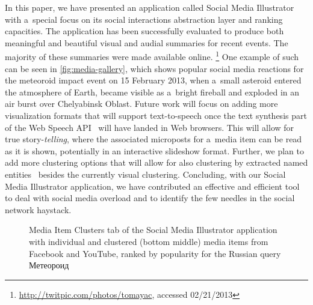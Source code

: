 \documentclass{sig-alternate}
\newcommand{\inlinelistingsize}{\fontsize{8pt}{11pt}}
\let\oldurl\url
\renewcommand{\url}[1]{\inlinelistingsize\oldurl{#1}}
\begin{document}
In this paper, we have presented an application called Social Media Illustrator with
a~special focus on its social interactions abstraction layer and ranking capacities.
The application has been successfully evaluated to produce both meaningful and beautiful
visual and audial summaries for recent events.
The majority of these summaries were made available online.%
\footnote{\url{http://twitpic.com/photos/tomayac}, accessed 02/21/2013}
One example of such can be seen in \autoref{fig:media-gallery},
which shows popular social media reactions for the meteoroid impact event
on 15 February 2013, when a~small asteroid entered the atmosphere of Earth,
became visible as a~bright fireball
and exploded in an air burst over Chelyabinsk Oblast.
Future work will focus on adding more visualization formats that will support
text-to-speech once the text synthesis part
of the Web Speech API~\cite{shires2012webspeech} will have landed in Web browsers.
This will allow for true story-\emph{telling}, where the associated microposts
for a~media item can be read as it is shown,
potentially in an interactive slideshow format.
Further, we plan to add more clustering options
that will allow for also clustering by extracted named entities~%
\cite{steiner2011addingmeaning} besides the currently visual clustering.
Concluding, with our Social Media Illustrator application, 
we have contributed an effective and efficient tool
to deal with social media overload
and to identify the few needles in the social network haystack. 

\begin{figure}[t!]
  \centering
  \setlength{\fboxsep}{1pt}
  \caption{Media Item Clusters tab of the Social Media Illustrator application
  with individual and clustered (bottom middle) media items from Facebook and YouTube,
  ranked by popularity for the Russian query
    \selectfont Метеороид \selectfont}
  \label{fig:application}
\end{figure}
\end{document}
